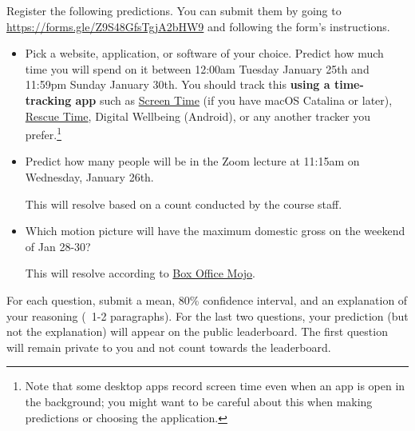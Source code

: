\documentclass[11pt]{article}
\begin{document}
Register the following predictions. You can submit them by going to 
\url{https://forms.gle/Z9S48GfsTgjA2bHW9} and following the form's instructions.

\begin{itemize}
\item Pick a website, application, or software of your choice. Predict how much time you will spend on it between 12:00am Tuesday January 25th and 11:59pm Sunday January 30th. You should track this {\bf using a time-tracking app} such as \href{https://support.apple.com/en-us/HT210387}{Screen Time} (if you have macOS Catalina or later), \href{https://www.rescuetime.com/}{Rescue Time}, Digital Wellbeing (Android), or any another tracker you prefer.\footnote{Note that some desktop apps record screen time even when an app is open in the background; you might want to be careful about this when making predictions or choosing the application.}

\item Predict how many people will be in the Zoom lecture at 11:15am on Wednesday, January 26th.

      This will resolve based on a count conducted by the course staff.

\item Which motion picture will have the maximum domestic gross on the weekend of Jan 28-30?

      This will resolve according to \href{https://www.boxofficemojo.com/weekend/?ref_=bo_nb_wey_secondarytab}{Box Office Mojo}.

\end{itemize}
 
For each question, submit a mean, 80\% confidence interval, and an explanation of your reasoning (~1-2 paragraphs).
For the last two questions, your prediction (but not the explanation) will appear on the public leaderboard. 
The first question will remain private to you and not count towards the leaderboard.
\end{document}
